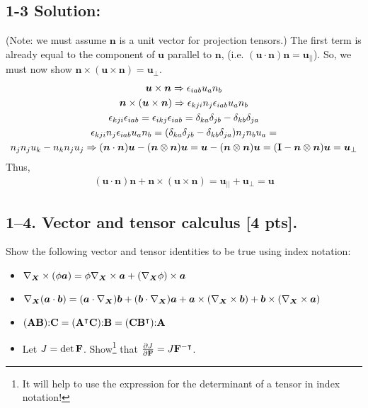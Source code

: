 \subsection*{\textbf{1-3 Solution:}}
(Note: we must assume $\bm{n}$ is a unit vector for projection tensors.) The first term is already equal to the component of $\bm{u}$ parallel to $\bm{n}$, (i.e. $(\bm{u}\cdot\bm{n})\bm{n}=\bm{u}_{||}$). So, we must now show $\bm{n}\times(\bm{u}\times\bm{n})= \bm{u}_{\perp}$.
\begin{gather*}
    \bm{u}\times\bm{n} \Rightarrow \epsilon_{iab}u_a n_b\\
    \bm{n}\times(\bm{u}\times\bm{n}) \Rightarrow \epsilon_{kji}n_j\epsilon_{iab}u_a n_b\\
    \epsilon_{kji}\epsilon_{iab}=\epsilon_{ikj}\epsilon_{iab}= \delta_{ka}\delta_{jb}-\delta_{kb}\delta_{ja}\\
    \epsilon_{kji}n_j\epsilon_{iab}u_a n_b=(\delta_{ka}\delta_{jb}-\delta_{kb}\delta_{ja})n_j n_b u_a=\\
    n_j n_j u_k - n_k n_j u_j \Rightarrow (\bm{n}\cdot\bm{n})\bm{u}-(\bm{n}\otimes\bm{n})\bm{u}=\bm{u}-(\bm{n}\otimes\bm{n})\bm{u}=(\mathbf{I}-\bm{n}\otimes\bm{n})\bm{u}=\bm{u}_{\perp}
\end{gather*}
Thus,
\begin{gather*}
    (\bm{u}\cdot\bm{n})\bm{n}+\bm{n}\times(\bm{u}\times\bm{n})= \bm{u}_{||}+\bm{u}_{\perp}=\bm{u}
\end{gather*}

\bigskip
\subsection*{1--4. \textbf{Vector and tensor calculus} [4 pts].} Show the following vector and tensor identities to be true using index notation:

\begin{itemize}
    \item $\nabla_{\bm{X}} \times (\phi \bm{a}) = \phi \nabla_{\bm{X}} \times \bm{a} + (\nabla_{\bm{X}}\phi) \times \bm{a}$
    \item $\nabla_{\bm{X}} (\bm{a} \cdot \bm{b}) = (\bm{a} \cdot \nabla_{\bm{X}}) \bm{b} + (\bm{b} \cdot \nabla_{\bm{X}}) \bm{a} + \bm{a} \times (\nabla_{\bm{X}} \times \bm{b}) + \bm{b} \times (\nabla_{\bm{X}} \times \bm{a})$
    \item $ (\mathbf{A} \mathbf{B}) \mathbf{:} \mathbf{C} = (\mathbf{A}^\intercal \mathbf{C})\mathbf{:} \mathbf{B} = (\mathbf{C} \mathbf{B}^\intercal)\mathbf{:} \mathbf{A}$
    \item Let $J = \det \mathbf{F}$. Show\footnote{It will help to use the expression for the determinant of a tensor in index notation!} that $\frac{\partial J}{\partial \mathbf{F}} = J \mathbf{F}^{-\intercal}$. 
    \end{itemize}

